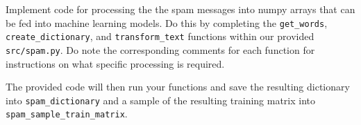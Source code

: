 \item {}
Implement code for processing the the spam messages into numpy arrays that can be fed into machine learning models. Do this by completing the \texttt{get\_words}, \texttt{create\_dictionary}, and \texttt{transform\_text} functions within our provided \texttt{src/spam.py}. Do note the corresponding comments for each function for instructions on what specific processing is required.

The provided code will then run your functions and save the resulting dictionary into \texttt{spam\_dictionary} and a sample of the resulting training matrix into\\
\texttt{spam\_sample\_train\_matrix}.\\[50pt]